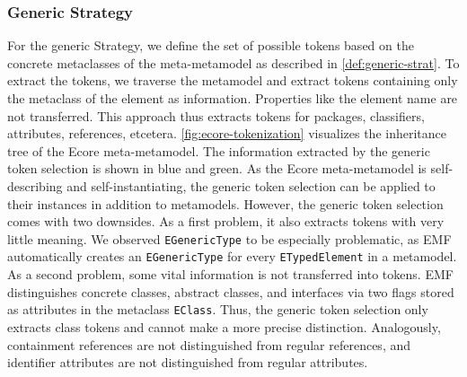 \subsubsection{Generic Strategy}
For the generic Strategy, we define the set of possible tokens based on the concrete metaclasses of the meta-metamodel as described in \autoref{def:generic-strat}.
To extract the tokens, we traverse the metamodel and extract tokens containing only the metaclass of the element as information. Properties like the element name are not transferred. This approach thus extracts tokens for packages, classifiers, attributes, references, etcetera.
\autoref{fig:ecore-tokenization} visualizes the inheritance tree of the Ecore meta-metamodel. The information extracted by the generic token selection is shown in blue and green. As the Ecore meta-metamodel is self-describing and self-instantiating, the generic token selection can be applied to their instances in addition to metamodels.
%
However, the generic token selection comes with two downsides.
As a first problem, it also extracts tokens with very little meaning. We observed \texttt{EGenericType} to be especially problematic, as \ac{EMF} automatically creates an \texttt{EGenericType} for every \texttt{ETypedElement} in a metamodel.
As a second problem, some vital information is not transferred into tokens. \ac{EMF} distinguishes concrete classes, abstract classes, and interfaces via two flags stored as attributes in the metaclass \texttt{EClass}.
Thus, the generic token selection only extracts class tokens and cannot make a more precise distinction. Analogously, containment references are not distinguished from regular references, and identifier attributes are not distinguished from regular attributes.

